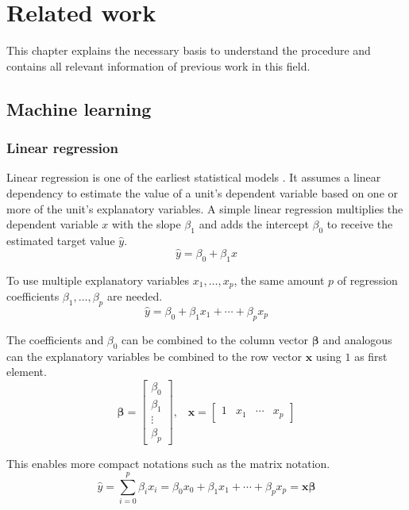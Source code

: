 \chapter{Related work}
This chapter explains the necessary basis to understand the procedure and contains all relevant information of previous work in this field.
\section{Machine learning}

\subsection{Linear regression}
Linear regression is one of the earliest statistical models \autocite{freedman2009}. It assumes a linear dependency to estimate the value of a unit's dependent variable based on one or more of the unit's explanatory variables. A simple linear regression multiplies the dependent variable $x$ with the slope $\beta_1$ and adds the intercept $\beta_0$ to receive the estimated target value $\hat{y}$.
\begin{equation}
    \hat{y} = \beta_0 + \beta_1 x
\end{equation}

To use multiple explanatory variables $x_1, \ldots, x_p$, the same amount $p$ of regression coefficients $\beta_1, \ldots, \beta_p$ are needed.
\begin{equation}
    \hat{y} = \beta_0 + \beta_1 x_1 + \cdots + \beta_p x_p
\end{equation}

The coefficients and $\beta_0$ can be combined to the column vector $\boldsymbol{\beta}$ and analogous can the explanatory variables be combined to the row vector $\mathbf{x}$ using $1$ as first element.
\begin{equation}
    \boldsymbol{\beta} = \begin{bmatrix}\beta_0\\\beta_1\\\vdots\\\beta_p\end{bmatrix}\text{,}\quad
    \mathbf{x} = \begin{bmatrix}1&x_1&\cdots&x_p\end{bmatrix}
\end{equation}

This enables more compact notations such as the matrix notation.
\begin{equation}
    \hat{y} = \sum_{i=0}^p \beta_i x_i = \beta_0 x_0 + \beta_1 x_1 + \cdots + \beta_p x_p = \mathbf{x}\boldsymbol{\beta}
\end{equation}

